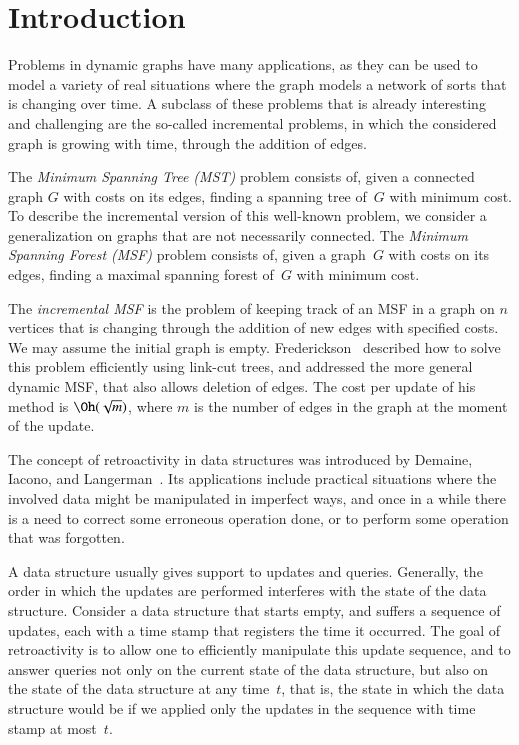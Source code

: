 \documentclass[3p,times,procedia]{elsarticle}
\begin{document}

\section{Introduction}

Problems in dynamic graphs have many applications, as they can be used to model a variety 
of real situations where the graph models a network of sorts that is changing over time. 
A subclass of these problems that is already interesting and challenging are the so-called 
incremental problems, in which the considered graph is growing with time, through the 
addition of edges.  

The \emph{Minimum Spanning Tree (MST)} problem consists of, given a connected 
graph $G$ with costs on its edges, finding a spanning tree of~$G$ with minimum cost. 
To describe the incremental version of this well-known problem, 
we consider a generalization on graphs that are not necessarily connected. 
The \emph{Minimum Spanning Forest (MSF)} problem consists of, given a graph~$G$ with 
costs on its edges, finding a maximal spanning forest of~$G$ with minimum cost. 

The \emph{incremental MSF} is the problem of keeping track of an MSF in a graph on 
$n$ vertices that is changing through the addition of new edges with specified costs.  
We may assume the initial graph is empty. 
Frederickson~\cite{Frederickson1983} described how to solve this problem efficiently 
using link-cut trees, and addressed the more general dynamic MSF,
that also allows deletion of edges.  The cost per update of his method is $\Oh(\sqrt{m})$, 
where $m$ is the number of edges in the graph at the moment of the update.

The concept of retroactivity in data structures was introduced by Demaine, Iacono, 
and Langerman~\cite{DemaineIL2007}.  Its applications include practical situations 
where the involved data might be manipulated in imperfect ways, and once in a while 
there is a need to correct some erroneous operation done, or to perform some operation 
that was forgotten.

A data structure usually gives support to updates and queries.  
Generally, the order in which the updates are performed interferes with the state 
of the data structure. 
Consider a data structure that starts empty, and suffers a sequence of updates, 
each with a time stamp that registers the time it occurred. 
The goal of retroactivity is to allow one to efficiently manipulate this update sequence, 
and to answer queries not only on the current state of the data structure, 
but also on the state of the data structure at any time~$t$, that is, 
the state in which the data structure would be if we applied only the updates 
in the sequence with time stamp at most~$t$.
\end{document}
